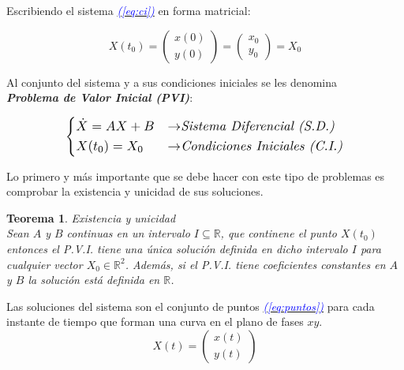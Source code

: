 \documentclass[12pt,a4paper]{report} %
\newtheorem{theorem}{Teorema}[chapter]
\newcommand{\eref}[1]{\hyperref[#1]{\textcolor{blue}{\textit{(\ref*{#1})}}}}
\begin{document}
	Escribiendo el sistema \eref{eq:ci} en forma matricial:
	
	\begin{equation}
		\label{cimat}
		X(t_0)=\begin{pmatrix}
			x(0)\\y(0)
		\end{pmatrix}=\begin{pmatrix}
		x_0\\y_0
		\end{pmatrix}=X_0
	\end{equation}\smallskip
	
	Al conjunto del sistema y a sus condiciones iniciales se les denomina \\ \textbf{\textit{Problema de Valor Inicial (PVI)}}: 
	
	\begin{equation}
	\label{eq:pvi}
	\scalebox{1.2}{$\displaystyle
		\left\{
		\begin{aligned}
			&\dot{X}=AX+B &\rightarrow& \textit{Sistema Diferencial (S.D.)}\\
			&X(t_0)=X_0 &\rightarrow& \textit{Condiciones Iniciales (C.I.)}
		\end{aligned}
		\right.
		$}
    \end{equation}\smallskip
	
	Lo primero y más importante que se debe hacer con este tipo de problemas es comprobar la existencia y unicidad de sus soluciones.
	\newpage
	\begin{theorem}\label{thm:interesante}
		Existencia y unicidad \\[2mm]
		\textit{Sean $A$ y $B$ continuas en un intervalo $I\subseteq  \mathbb{R}$, que continene el punto $X(t_0)$ entonces el P.V.I. tiene una única solución definida en dicho intervalo $I$ para cualquier vector $X_0 \in \mathbb{R}^2$}. Además, si el P.V.I. tiene coeficientes constantes en $A$ y $B$ la solución está definida en $\mathbb{R}$.
	\end{theorem}
	\vspace{4mm}
	
	Las soluciones del sistema son el conjunto de puntos \eref{eq:puntos} para cada instante de tiempo que forman una curva en el plano de fases $xy$.
	\begin{equation}
		\label{eq:puntos}
		X(t)=\begin{pmatrix}
			x(t) \\ y(t)
		\end{pmatrix}
	\end{equation}\smallskip
	
\end{document}
